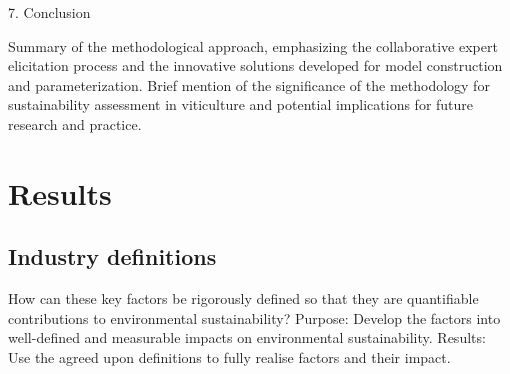 7. Conclusion

    Summary of the methodological approach, emphasizing the collaborative expert elicitation process and the innovative solutions developed for model construction and parameterization.
    Brief mention of the significance of the methodology for sustainability assessment in viticulture and potential implications for future research and practice.

\section{Results}

\subsection{Industry definitions}

How can these key factors be rigorously defined so that they are quantifiable contributions to environmental sustainability?
Purpose: Develop the factors into well-defined and measurable impacts on environmental sustainability.
Results: Use the agreed upon definitions to fully realise factors and their impact.

